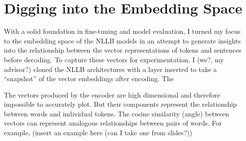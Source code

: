 \section{Digging into the Embedding Space}

With a solid foundation in fine-tuning and model evaluation, I turned my focus to the embedding space of the NLLB models in an attempt to generate insights into the relationship between the vector representations of tokens and sentences before decoding. To capture these vectors for experimentation, I (we?, my advisor?) cloned the NLLB architectures with a layer inserted to take a “snapshot” of the vector embeddings after encoding. The 

The vectors produced by the encoder are high dimensional and therefore impossible to accurately plot. But their components represent the relationship between words and individual tokens. The cosine similarity (angle) between vectors can represent analogous relationships between pairs of words. For example, (insert an example here (can I take one from slides?)) 


